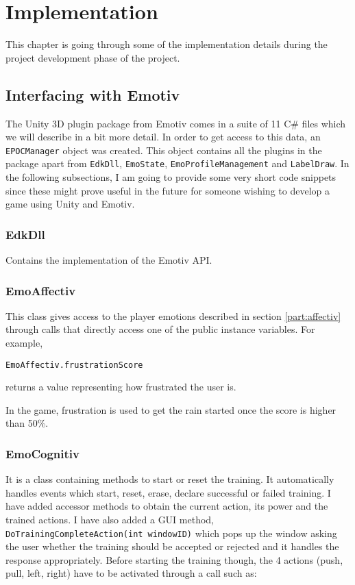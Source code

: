 \chapter{Implementation}
\label{cha:implementation}

This chapter is going through some of the implementation details during the project development phase of the project.

\section{Interfacing with Emotiv}
The Unity 3D plugin package from Emotiv comes in a suite of 11 C\# files which we will describe in a bit more detail. In order to get access to this data, an  \texttt{EPOCManager} object was created. This object contains all the plugins in the package apart from  \texttt{EdkDll}, \texttt{EmoState}, \texttt{EmoProfileManagement} and \texttt{LabelDraw}. In the following subsections, I am going to provide some very short code snippets since these might prove useful in the future for someone wishing to develop a game using Unity and Emotiv.

\subsection{EdkDll}
Contains the implementation of the Emotiv API.

\subsection{EmoAffectiv} 
This class gives access to the player emotions described in section \ref{part:affectiv} through calls that directly access one of the public instance variables. For example,

\begin{Verbatim}[frame=single, framesep=3mm]
EmoAffectiv.frustrationScore
\end{Verbatim}

returns a value representing how frustrated the user is.

In the game, frustration is used to get the rain started once the score is higher than 50\%. 

\subsection{EmoCognitiv} 
It is a class containing methods to start or reset the training. It automatically handles events which start, reset, erase, declare successful or failed training. I have added accessor methods to obtain the current action, its power and the trained actions. I have also added a GUI method, \texttt{DoTrainingCompleteAction(int windowID)} which pops up the window asking the user whether the training should be accepted or rejected and it handles the response appropriately. Before starting the training though, the 4 actions (push, pull, left, right) have to be activated through a call such as: 

